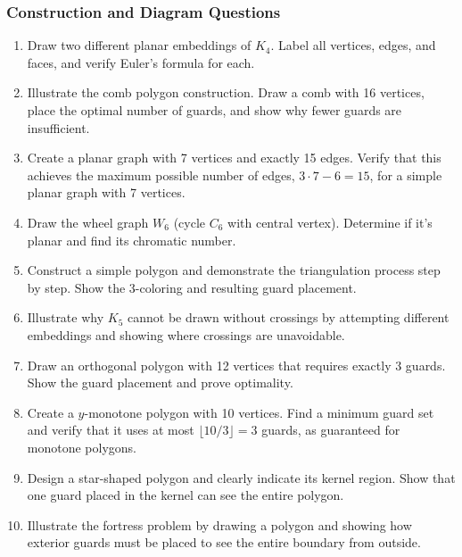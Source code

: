 \documentclass{article}
\theoremstyle{definition}
\begin{document}
\subsubsection{Construction and Diagram Questions}
\begin{enumerate}[start=31]
\item Draw two different planar embeddings of $K_4$. Label all vertices, edges, and faces, and verify Euler's formula for each.

\item Illustrate the comb polygon construction. Draw a comb with 16 vertices, place the optimal number of guards, and show why fewer guards are insufficient.

\item Create a planar graph with 7 vertices and exactly 15 edges. Verify that this achieves the maximum possible number of edges, $3 \cdot 7 - 6 = 15$, for a simple planar graph with 7 vertices.

\item Draw the wheel graph $W_6$ (cycle $C_6$ with central vertex). Determine if it's planar and find its chromatic number.

\item Construct a simple polygon and demonstrate the triangulation process step by step. Show the 3-coloring and resulting guard placement.

\item Illustrate why $K_5$ cannot be drawn without crossings by attempting different embeddings and showing where crossings are unavoidable.

\item Draw an orthogonal polygon with 12 vertices that requires exactly 3 guards. Show the guard placement and prove optimality.

\item Create a $y$-monotone polygon with 10 vertices. Find a minimum guard set and verify that it uses at most $\lfloor 10/3 \rfloor = 3$ guards, as guaranteed for monotone polygons.

\item Design a star-shaped polygon and clearly indicate its kernel region. Show that one guard placed in the kernel can see the entire polygon.

\item Illustrate the fortress problem by drawing a polygon and showing how exterior guards must be placed to see the entire boundary from outside.
\end{enumerate}
\end{document}

